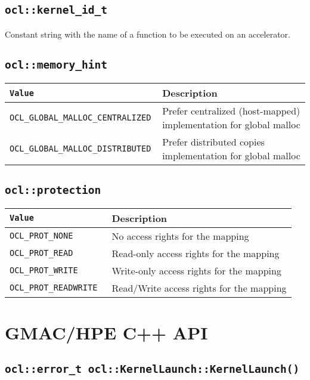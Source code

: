 \subsection{\texttt{ocl::kernel\_id\_t}}

Constant string with the name of a function to be executed on an accelerator.

\subsection{\texttt{ocl::memory\_hint}}

\begin{tabularx}{\linewidth}{|>{\texttt\bgroup}l<{\egroup}|X|}
  \hline
  \textnormal{Value} & Description \\
  \hline
  \hline
  OCL\_GLOBAL\_MALLOC\_CENTRALIZED & Prefer centralized (host\hyp{}mapped) implementation for global 
  malloc \\
  OCL\_GLOBAL\_MALLOC\_DISTRIBUTED & Prefer distributed copies implementation for global malloc \\
  \hline
\end{tabularx}


\subsection{\texttt{ocl::protection}}

\begin{tabularx}{\linewidth}{|>{\texttt\bgroup}l<{\egroup}|X|}
  \hline
  \textnormal{Value} & Description \\
  \hline
  \hline
  OCL\_PROT\_NONE  & No access rights for the mapping \\
  OCL\_PROT\_READ  & Read\hyp{}only access rights for the mapping \\
  OCL\_PROT\_WRITE & Write\hyp{}only access rights for the mapping \\
  OCL\_PROT\_READWRITE & Read\slash{}Write access rights for the mapping \\
  \hline
\end{tabularx}

\section{GMAC\slash HPE C++ API}

\subsection{\texttt{ocl::error\_t ocl::KernelLaunch::KernelLaunch()}}

